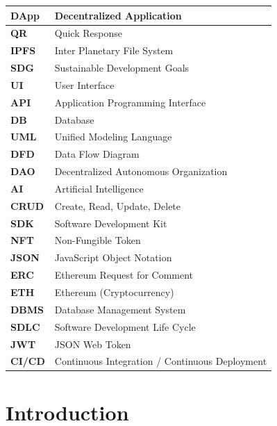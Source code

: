\documentclass[12pt,a4paper]{report}
\begin{document}
\noindent
\renewcommand{\arraystretch}{1.28}
\begin{tabular}{|p{2.6cm}|p{11.0cm}|}
\hline
\textbf{DApp} & Decentralized Application \\ \hline
\textbf{QR} & Quick Response \\ \hline
\textbf{IPFS} & Inter Planetary File System \\ \hline
\textbf{SDG} & Sustainable Development Goals \\ \hline
\textbf{UI} & User Interface \\ \hline
\textbf{API} & Application Programming Interface \\ \hline
\textbf{DB} & Database \\ \hline
\textbf{UML} & Unified Modeling Language \\ \hline
\textbf{DFD} & Data Flow Diagram \\ \hline
\textbf{DAO} & Decentralized Autonomous Organization \\ \hline
\textbf{AI} & Artificial Intelligence \\ \hline
\textbf{CRUD} & Create, Read, Update, Delete \\ \hline
\textbf{SDK} & Software Development Kit \\ \hline
\textbf{NFT} & Non-Fungible Token \\ \hline
\textbf{JSON} & JavaScript Object Notation \\ \hline
\textbf{ERC} & Ethereum Request for Comment \\ \hline
\textbf{ETH} & Ethereum (Cryptocurrency) \\ \hline
\textbf{DBMS} & Database Management System \\ \hline
\textbf{SDLC} & Software Development Life Cycle \\ \hline
\textbf{JWT} & JSON Web Token \\ \hline
\textbf{CI/CD} & Continuous Integration / Continuous Deployment \\ \hline
\end{tabular}

\cleardoublepage
{}
\setcounter{page}{1}

\chapter{Introduction}
\end{document}
